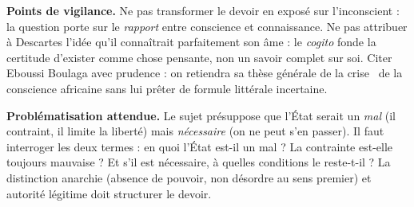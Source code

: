 \documentclass[11pt]{article}
\newcommand{\cle}[1]{{\popxbold\color{popdark}#1}}
\begin{document}
\begin{corrige}
\textbf{Points de vigilance.} Ne pas transformer le devoir en exposé sur l'inconscient : la question porte sur le \emph{rapport} entre conscience et connaissance. Ne pas attribuer à Descartes l'idée qu'il connaîtrait parfaitement son âme : le \emph{cogito} fonde la certitude d'exister comme chose pensante, non un savoir complet sur soi. Citer Eboussi Boulaga avec prudence : on retiendra sa thèse générale de la \guillemotleft crise \guillemotright\ de la conscience africaine sans lui prêter de formule littérale incertaine.
\end{corrige}

\begin{corrige}
\textbf{Problématisation attendue.} Le sujet présuppose que l'État serait un \emph{mal} (il contraint, il limite la liberté) mais \emph{nécessaire} (on ne peut s'en passer). Il faut interroger les deux termes : en quoi l'État est-il un mal ? La contrainte est-elle toujours mauvaise ? Et s'il est nécessaire, à quelles conditions le reste-t-il ? La distinction \cle{anarchie} (absence de pouvoir, non désordre au sens premier) et \cle{autorité légitime} doit structurer le devoir.


\end{corrige}
\end{document}
